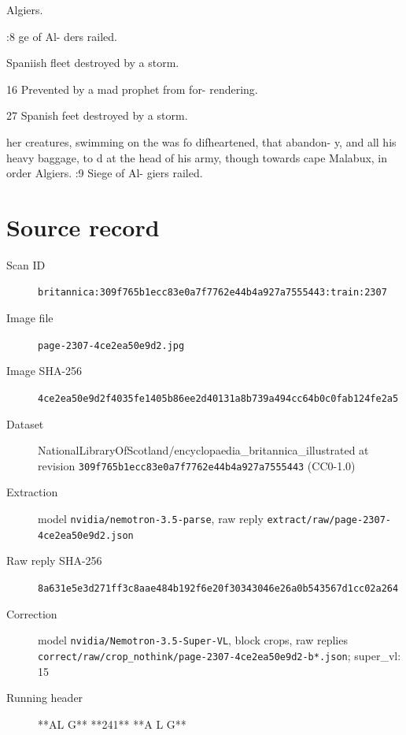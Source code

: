 \documentclass{article}
\begin{document}
Algiers.

:8
ge of Al-
ders railed.

Spaniish fleet destroyed by a storm.

16 Prevented by a mad prophet from for- rendering.

27 Spanish feet destroyed by a storm.

her creatures, swimming on the
was fo difheartened, that abandon-
y, and all his heavy baggage, to
d at the head of his army, though
towards cape Malabux, in order
Algiers.
:9
Siege of Al-
giers railed.


\section*{Source record}
\begin{description}
\item[Scan ID] \texttt{britannica:309f765b1ecc83e0a7f7762e44b4a927a7555443:train:2307}
\item[Image file] \texttt{page-2307-4ce2ea50e9d2.jpg}
\item[Image SHA-256] \texttt{4ce2ea50e9d2f4035fe1405b86ee2d40131a8b739a494cc64b0c0fab124fe2a5}
\item[Dataset] NationalLibraryOfScotland/encyclopaedia\_britannica\_illustrated at revision \texttt{309f765b1ecc83e0a7f7762e44b4a927a7555443} (CC0-1.0)
\item[Extraction] model \texttt{nvidia/nemotron-3.5-parse}, raw reply \texttt{extract/raw/page-2307-4ce2ea50e9d2.json}
\item[Raw reply SHA-256] \texttt{8a631e5e3d271ff3c8aae484b192f6e20f30343046e26a0b543567d1cc02a264}
\item[Correction] model \texttt{nvidia/Nemotron-3.5-Super-VL}, block crops, raw replies \texttt{correct/raw/crop\_nothink/page-2307-4ce2ea50e9d2-b*.json}; super\_vl: 15
\item[Running header] **AL G** **241** **A L G**
\end{description}
\end{document}
